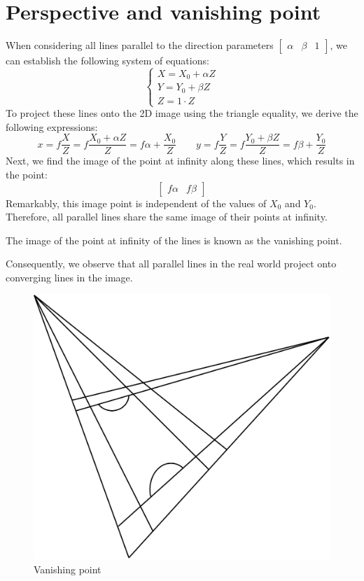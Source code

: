 \section{Perspective and vanishing point}

When considering all lines parallel to the direction parameters $\begin{bmatrix} \alpha & \beta & 1 \end{bmatrix}$, we can establish the following system of equations:
\[\begin{cases} X = X_0 + \alpha Z \\ Y = Y_0 + \beta Z \\ Z = 1 \cdot Z \end{cases}\]
To project these lines onto the 2D image using the triangle equality, we derive the following expressions:
\[x=f \dfrac{X}{Z} = f \dfrac{X_0 + \alpha Z}{Z} = f\alpha + \dfrac{X_0}{Z} \qquad y=f \dfrac{Y}{Z} = f \dfrac{Y_0 + \beta Z}{Z}  = f\beta  + \dfrac{Y_0}{Z}\]
Next, we find the image of the point at infinity along these lines, which results in the point:
\[\begin{bmatrix} f\alpha & f\beta \end{bmatrix}\]
Remarkably, this image point is independent of the values of $X_0$ and $Y_0$. 
Therefore, all parallel lines share the same image of their points at infinity.
\begin{definition}
    The image of the point at infinity of the lines is known as the vanishing point. 
\end{definition}
Consequently, we observe that all parallel lines in the real world project onto converging lines in the image.
\begin{figure}[H]
    \centering
    \includegraphics[width=0.4\linewidth]{images/vanishingpoint.png}
    \caption{Vanishing point}
\end{figure}